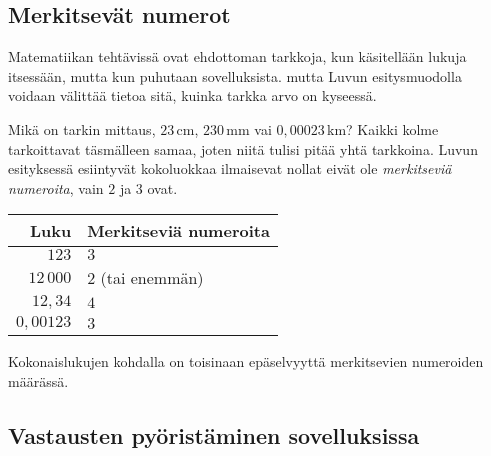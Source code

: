 
\subsection{Merkitsevät numerot}

Matematiikan tehtävissä ovat ehdottoman tarkkoja, kun käsitellään lukuja itsessään, mutta kun puhutaan sovelluksista. mutta Luvun esitysmuodolla voidaan välittää tietoa sitä, kuinka tarkka arvo on kyseessä.

Mikä on tarkin mittaus, $23$\,cm, $230$\,mm vai $0,00023$\,km? Kaikki kolme tarkoittavat täsmälleen samaa, joten niitä tulisi pitää yhtä tarkkoina. Luvun esityksessä esiintyvät kokoluokkaa ilmaisevat nollat eivät ole \emph{merkitseviä numeroita}, vain $2$ ja $3$ ovat.


\begin{center}
\begin{tabular}{r|l}
Luku & Merkitseviä numeroita \\
\hline
$123$ & $3$ \\
$12\,000$ & $2$ (tai enemmän)\\
$12,34$ & $4$ \\
$0,00123$ & $3$
\end{tabular}
\end{center} %


Kokonaislukujen kohdalla on toisinaan epäselvyyttä merkitsevien numeroiden määrässä.

\begin{esimerkki}
\end{esimerkki}

\subsection*{Vastausten pyöristäminen sovelluksissa} %

